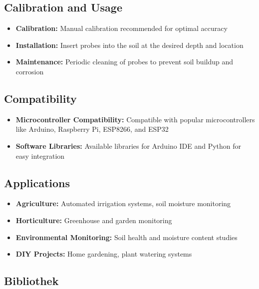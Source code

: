 \subsection*{Calibration and Usage}
\begin{itemize}
	\item \textbf{Calibration:} Manual calibration recommended for optimal accuracy
	\item \textbf{Installation:} Insert probes into the soil at the desired depth and location
	\item \textbf{Maintenance:} Periodic cleaning of probes to prevent soil buildup and corrosion
\end{itemize}

\subsection*{Compatibility}
\begin{itemize}
	\item \textbf{Microcontroller Compatibility:} Compatible with popular microcontrollers like Arduino, Raspberry Pi, ESP8266, and ESP32
	\item \textbf{Software Libraries:} Available libraries for Arduino IDE and Python for easy integration
\end{itemize}

\subsection*{Applications}
\begin{itemize}
	\item \textbf{Agriculture:} Automated irrigation systems, soil moisture monitoring
	\item \textbf{Horticulture:} Greenhouse and garden monitoring
	\item \textbf{Environmental Monitoring:} Soil health and moisture content studies
	\item \textbf{DIY Projects:} Home gardening, plant watering systems
\end{itemize}

\subsection{Bibliothek}

